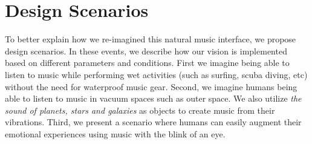 \documentclass[sigchi]{acmart}
\begin{document}
\section{Design Scenarios}
To better explain how we re-imagined this natural music interface, we propose design scenarios. In these events, we describe how our vision is implemented based on different parameters and conditions. First we imagine being able to listen to music while performing wet activities (such as surfing, scuba diving, etc) without the need for waterproof music gear. Second, we imagine humans being able to listen to music in vacuum spaces such as outer space. We also utilize \textit{the sound of planets, stars and galaxies} as objects to create music from their vibrations. Third, we present a scenario where humans can easily augment their emotional experiences using music with the blink of an eye. 
\end{document}
